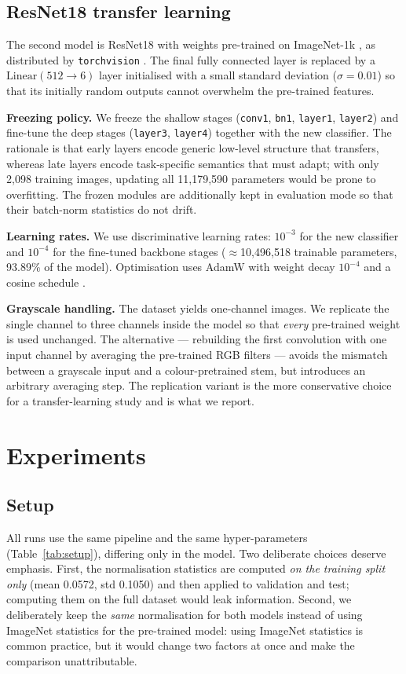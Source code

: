 \documentclass[sigconf, screen]{acmart}
\begin{document}
\subsection{ResNet18 transfer learning}
The second model is ResNet18 \cite{resnet2016} with weights pre-trained on
ImageNet-1k \cite{imagenet2009}, as distributed by \texttt{torchvision}
\cite{pytorch2019}. The final fully connected layer is replaced by a
$\mathrm{Linear}(512 \rightarrow 6)$ layer initialised with a small standard
deviation ($\sigma=0.01$) so that its initially random outputs cannot overwhelm
the pre-trained features.

\textbf{Freezing policy.} We freeze the shallow stages
(\texttt{conv1}, \texttt{bn1}, \texttt{layer1}, \texttt{layer2}) and fine-tune the
deep stages (\texttt{layer3}, \texttt{layer4}) together with the new classifier.
The rationale is that early layers encode generic low-level structure that
transfers, whereas late layers encode task-specific semantics that must adapt;
with only 2,098 training images, updating all 11,179,590 parameters
would be prone to overfitting. The frozen modules are additionally kept in
evaluation mode so that their batch-norm statistics do not drift.

\textbf{Learning rates.} We use discriminative learning rates: $10^{-3}$ for the
new classifier and $10^{-4}$ for the fine-tuned backbone stages
($\approx$10,496,518 trainable parameters, 93.89\% of the model).
Optimisation uses AdamW \cite{adamw2019} with weight decay $10^{-4}$ and a cosine
schedule \cite{sgdr2017}.

\textbf{Grayscale handling.} The dataset yields one-channel images. We replicate
the single channel to three channels inside the model so that \emph{every}
pre-trained weight is used unchanged. The alternative --- rebuilding the first
convolution with one input channel by averaging the pre-trained RGB filters ---
avoids the mismatch between a grayscale input and a colour-pretrained stem, but
introduces an arbitrary averaging step. The replication variant is the more
conservative choice for a transfer-learning study and is what we report.

\section{Experiments}

\subsection{Setup}
All runs use the same pipeline and the same hyper-parameters (Table~\ref{tab:setup}),
differing only in the model. Two deliberate choices deserve emphasis. First, the
normalisation statistics are computed \emph{on the training split only}
(mean 0.0572, std 0.1050) and then applied to validation and test;
computing them on the full dataset would leak information. Second, we deliberately
keep the \emph{same} normalisation for both models instead of using ImageNet
statistics for the pre-trained model: using ImageNet statistics is common practice,
but it would change two factors at once and make the comparison unattributable.
\end{document}
